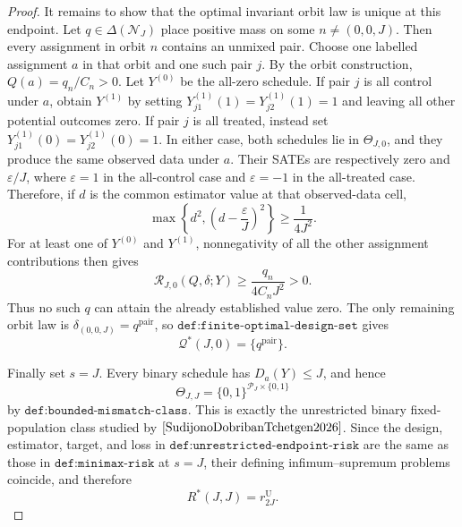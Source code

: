 \documentclass{article}
\begin{document}
\begin{proof}
It remains to show that the optimal invariant orbit law is unique at this endpoint.  Let \(q\in\Delta(\mathcal N_J)\) place positive mass on some \(n\ne(0,0,J)\).  Then every assignment in orbit \(n\) contains an unmixed pair.  Choose one labelled assignment \(a\) in that orbit and one such pair \(j\).  By the orbit construction, \(Q(a)=q_n/C_n>0\).  Let \(Y^{(0)}\) be the all-zero schedule.  If pair \(j\) is all control under \(a\), obtain \(Y^{(1)}\) by setting \(Y^{(1)}_{j1}(1)=Y^{(1)}_{j2}(1)=1\) and leaving all other potential outcomes zero.  If pair \(j\) is all treated, instead set \(Y^{(1)}_{j1}(0)=Y^{(1)}_{j2}(0)=1\).  In either case, both schedules lie in \(\Theta_{J,0}\), and they produce the same observed data under \(a\).  Their SATEs are respectively zero and \(\varepsilon/J\), where \(\varepsilon=1\) in the all-control case and \(\varepsilon=-1\) in the all-treated case.  Therefore, if \(d\) is the common estimator value at that observed-data cell,
\[
 \max\left\{d^2,\left(d-\frac{\varepsilon}{J}\right)^2\right\}
 \ge \frac1{4J^2}.
\]
For at least one of \(Y^{(0)}\) and \(Y^{(1)}\), nonnegativity of all the other assignment contributions then gives
\[
 \mathcal R_{J,0}(Q,\delta;Y)
 \ge \frac{q_n}{4C_nJ^2}>0.
\]
Thus no such \(q\) can attain the already established value zero.  The only remaining orbit law is \(\delta_{(0,0,J)}=q^{\mathrm{pair}}\), so \(\texttt{def:finite-optimal-design-set}\) gives
\[
 \mathcal Q^*(J,0)=\{q^{\mathrm{pair}}\}.
\]

Finally set \(s=J\).  Every binary schedule has \(D_a(Y)\le J\), and hence
\[
 \Theta_{J,J}=\{0,1\}^{\mathcal P_J\times\{0,1\}}
\]
by \(\texttt{def:bounded-mismatch-class}\).  This is exactly the unrestricted binary fixed-population class studied by \(\cite{SudijonoDobribanTchetgen2026}\).  Since the design, estimator, target, and loss in \(\texttt{def:unrestricted-endpoint-risk}\) are the same as those in \(\texttt{def:minimax-risk}\) at \(s=J\), their defining infimum--supremum problems coincide, and therefore
\[
 R^*(J,J)=r^{\mathrm U}_{2J}.
\]


\end{proof}
\end{document}

